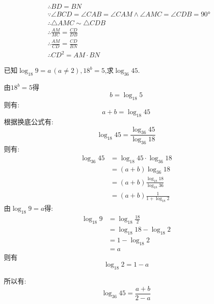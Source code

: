 \begin{questions}
\begin{proofsolution}
\begin{penum}
\begin{align*}
				       & \therefore BD = BN                                                                          \\
				       & \because \angle{BCD} = \angle{CAB} = \angle{CAM} \land \angle{AMC} = \angle{CDB} = \ang{90} \\
				       & \therefore \triangle{AMC} \sim \triangle{CDB}                                               \\
				       & \therefore \frac{AM}{MC} = \frac{CD}{DB}                                                    \\
				       & \therefore \frac{AM}{CD} = \frac{CD}{BN}                                                    \\
				       & \therefore CD^2 = AM\cdot BN
			      \end{align*}
		\end{penum}
	\end{proofsolution}

	\question[12] 已知$\log_{18}9=a\,(a\neq2), 18^b=5$,求$\log_{36}45$.

	\begin{solution}
		由$18^b=5$得
		\begin{equation*}
			b = \log_{18}5
		\end{equation*}
		则有:
		\begin{equation*}
			a + b = \log_{18}{45}
		\end{equation*}
		根据换底公式有:
		\begin{equation*}
			\log_{18}{45} = \frac{\log_{36}{45}}{\log_{36}{18}}
		\end{equation*}
		则有:
		\begin{align*}
			\log_{36}{45} & = \log_{18}{45}\cdot \log_{36}{18}         \\
			              & = (a+b)\log_{36}{18}                       \\
			              & = (a+b)\frac{\log_{18}{18}}{\log_{18}{36}} \\
			              & = (a+b)\frac1{1+\log_{18}2}
		\end{align*}
		由$\log_{18}{9} = a$得:
		\begin{align*}
			\log_{18}9 & = \log_{18}\frac{18}{2}    \\
			           & = \log_{18}18 - \log_{18}2 \\
			           & = 1 - \log_{18}{2}         \\
			           & = a
		\end{align*}
		则有
		\begin{equation*}
			\log_{18}2 = 1 - a
		\end{equation*}

		所以有:
		\begin{equation*}
			\log_{36}{45} = \frac{a+b}{2-a}
		\end{equation*}

	\end{solution}

\end{questions}
